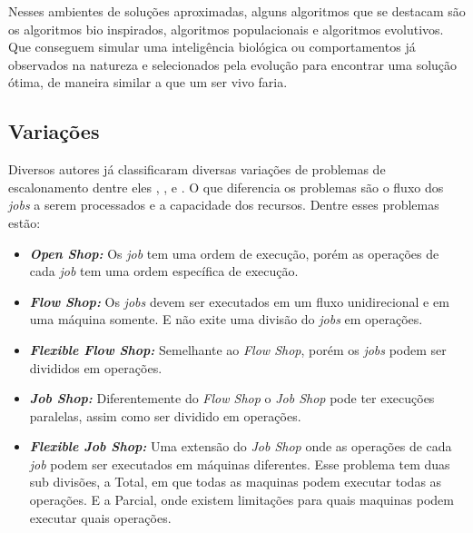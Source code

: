         Nesses ambientes de soluções aproximadas, alguns algoritmos que se destacam são os algoritmos bio inspirados, algoritmos populacionais e algoritmos evolutivos. Que conseguem simular uma inteligência biológica ou comportamentos já observados na natureza e selecionados pela evolução para encontrar uma solução ótima, de maneira similar a que um ser vivo faria.


    \subsection{Variações}
        Diversos autores já classificaram diversas variações de problemas de escalonamento dentre eles \cite{graham1979}, \cite{Lenstra1979}, e \cite{maccarthy1993}. O que diferencia os problemas são o fluxo dos \textit{jobs} a serem processados e a capacidade dos recursos. Dentre esses problemas estão:
        \begin{itemize}
            \item \textbf{\textit{Open Shop:}} Os \textit{job} tem uma ordem de execução, porém as operações de cada \textit{job} tem uma ordem específica de execução.
            
            \item \textbf{\textit{Flow Shop:}} Os \textit{jobs} devem ser executados em um fluxo unidirecional e em uma máquina somente. E não exite uma divisão do \textit{jobs} em operações.
            
            \item \textbf{\textit{Flexible Flow Shop:}} Semelhante ao \textit{Flow Shop}, porém os \textit{jobs} podem ser divididos em operações.
            
            \item \textbf{\textit{Job Shop:}} Diferentemente do \textit{Flow Shop} o \textit{Job Shop} pode ter execuções paralelas, assim como ser dividido em operações.
            
            \item \textbf{\textit{Flexible Job Shop:}} Uma extensão do \textit{Job Shop} onde as operações de cada \textit{job} podem ser executados em máquinas diferentes. Esse problema tem duas sub divisões, a Total, em que todas as maquinas podem executar todas as operações. E a Parcial, onde existem limitações para quais maquinas podem executar quais operações.
        \end{itemize}

